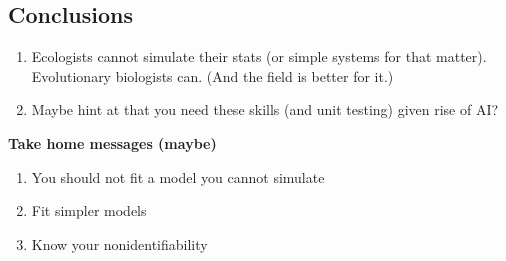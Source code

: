 \documentclass[11pt]{article}
\begin{document}
\subsection{Conclusions}
\begin{enumerate}
\item Ecologists cannot simulate their stats (or simple systems for that matter). Evolutionary biologists can. (And the field is better for it.)
\item Maybe hint at that you need these skills (and unit testing) given rise of AI?
\end{enumerate}

{\bf Take home messages (maybe)}
\begin{enumerate}
\item You should not fit a model you cannot simulate
\item Fit simpler models
\item Know your nonidentifiability
\end{enumerate}
\end{document}
